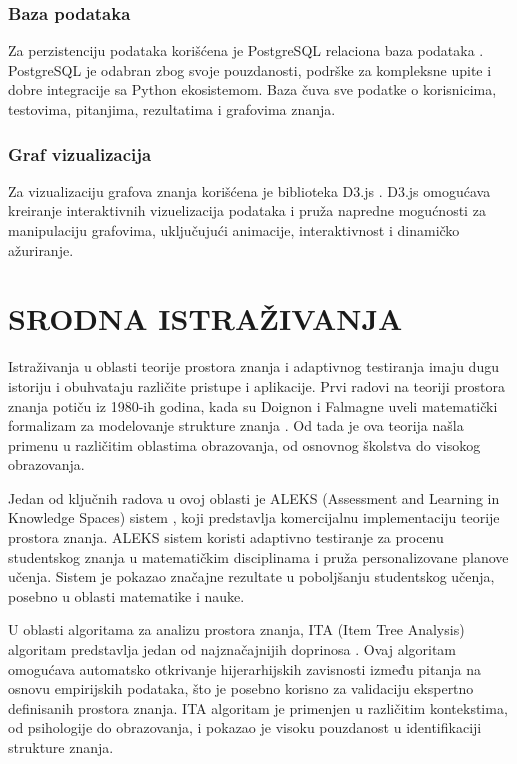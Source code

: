 \documentclass[conference]{IEEEtran}
\begin{document}
\subsubsection{Baza podataka}
Za perzistenciju podataka korišćena je PostgreSQL relaciona baza podataka \cite{postgresql2020}. PostgreSQL je odabran zbog svoje pouzdanosti, podrške za kompleksne upite i dobre integracije sa Python ekosistemom. Baza čuva sve podatke o korisnicima, testovima, pitanjima, rezultatima i grafovima znanja.

\subsubsection{Graf vizualizacija}
Za vizualizaciju grafova znanja korišćena je biblioteka D3.js \cite{d3js2020}. D3.js omogućava kreiranje interaktivnih vizuelizacija podataka i pruža napredne mogućnosti za manipulaciju grafovima, uključujući animacije, interaktivnost i dinamičko ažuriranje.

\section{SRODNA ISTRAŽIVANJA}

Istraživanja u oblasti teorije prostora znanja i adaptivnog testiranja imaju dugu istoriju i obuhvataju različite pristupe i aplikacije. Prvi radovi na teoriji prostora znanja potiču iz 1980-ih godina, kada su Doignon i Falmagne uveli matematički formalizam za modelovanje strukture znanja \cite{doignon1999}. Od tada je ova teorija našla primenu u različitim oblastima obrazovanja, od osnovnog školstva do visokog obrazovanja.

Jedan od ključnih radova u ovoj oblasti je ALEKS (Assessment and Learning in Knowledge Spaces) sistem \cite{aleks2009}, koji predstavlja komercijalnu implementaciju teorije prostora znanja. ALEKS sistem koristi adaptivno testiranje za procenu studentskog znanja u matematičkim disciplinama i pruža personalizovane planove učenja. Sistem je pokazao značajne rezultate u poboljšanju studentskog učenja, posebno u oblasti matematike i nauke.

U oblasti algoritama za analizu prostora znanja, ITA (Item Tree Analysis) algoritam predstavlja jedan od najznačajnijih doprinosa \cite{vanleeuwen2006}. Ovaj algoritam omogućava automatsko otkrivanje hijerarhijskih zavisnosti između pitanja na osnovu empirijskih podataka, što je posebno korisno za validaciju ekspertno definisanih prostora znanja. ITA algoritam je primenjen u različitim kontekstima, od psihologije do obrazovanja, i pokazao je visoku pouzdanost u identifikaciji strukture znanja.
\end{document}
